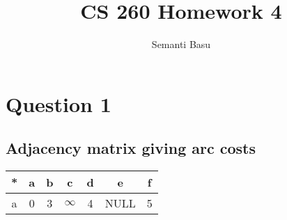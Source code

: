 \documentclass{article}
\begin{document}
\title {CS 260 Homework 4}
\author{Semanti Basu}
\maketitle


\section*{Question 1}
\subsection*{Adjacency matrix giving arc costs}
\begin{center}
\begin{tabular}{c|c|c|c|c|c|c|}
\hline
* & a & b & c & d & e & f\\ \hline
a & 0 & 3 & $\infty$ & 4 & NULL & 5\\ \hline
\end{tabular}
\end{center}
\end{document}
